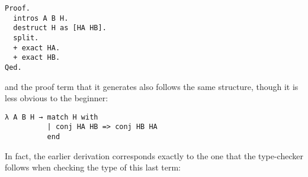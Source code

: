 \begin{verbatim}
Proof.
  intros A B H.
  destruct H as [HA HB].
  split.
  + exact HA.
  + exact HB.
Qed.
\end{verbatim}

and the proof term that it generates also follows the same structure, though it
is less obvious to the beginner:

\begin{verbatim}
λ A B H → match H with
          | conj HA HB => conj HB HA
          end
\end{verbatim}

In fact, the earlier derivation corresponds exactly to the one that the
type-checker follows when checking the type of this last term:


